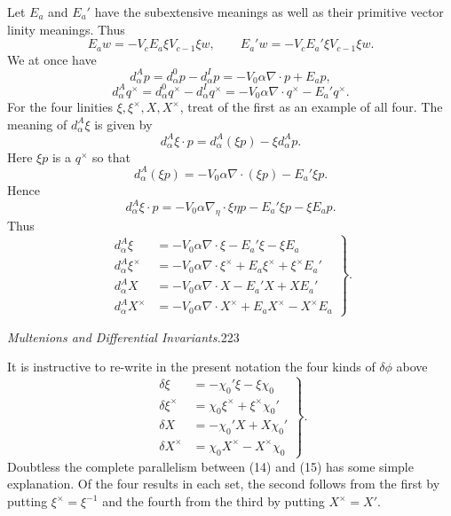 \documentclass[11pt]{article}
\begin{document}
\indent Let $E_a$ and $E_a'$ have the subextensive meanings as well as their primitive vector linity meanings. Thus
\begin{equation}E_aw=-V_cE_a\xi V_{c-1}\xi w,\qquad E_a'w=-V_cE_a'\xi V_{c-1}\xi w.\tag{11}\end{equation}
We at once have
\begin{equation}d_{\alpha}^{A}p=d_{\alpha}^{0}p-d_{\alpha}^{I}p=-V_0\alpha\nabla\cdot p+E_ap,\tag{12}\end{equation}
\begin{equation}d_{\alpha}^{A}q^\times=d_{\alpha}^{0}q^\times-d_{\alpha}^{I}q^\times=-V_0\alpha\nabla\cdot q^\times-E_a'q^\times.\tag{13}\end{equation}
For the four linities $\xi,\xi^\times,X,X^\times$, treat of the first as an example of all four. The meaning of $d_{\alpha}^{A}\xi$ is given by
\[
d_{\alpha}^{A}\xi\cdot p=d_{\alpha}^{A}(\xi p)-\xi d_{\alpha}^{A}p.
\]
Here $\xi p$ is a $q^\times$ so that
\[
d_{\alpha}^{A}(\xi p)=-V_0\alpha\nabla\cdot(\xi p)-E_a'\xi p.
\]
Hence
\[
d_{\alpha}^{A}\xi\cdot p=-V_0\alpha\nabla_\eta\cdot\xi\eta p-E_a'\xi p-\xi E_ap.
\]
Thus
\begin{equation}\left.\begin{aligned}
d_{\alpha}^{A}\xi&=-V_0\alpha\nabla\cdot\xi-E_a'\xi-\xi E_a\\
d_{\alpha}^{A}\xi^\times&=-V_0\alpha\nabla\cdot\xi^\times+E_a\xi^\times+\xi^\times E_a'\\
d_{\alpha}^{A}X&=-V_0\alpha\nabla\cdot X-E_a'X+XE_a'\\
d_{\alpha}^{A}X^\times&=-V_0\alpha\nabla\cdot X^\times+E_aX^\times-X^\times E_a
\end{aligned}\right\}.\tag{14}\end{equation}
\newpage\thispagestyle{empty}\begin{center}\textit{Multenions and Differential Invariants.}\hfill 223\end{center}
It is instructive to re-write in the present notation the four kinds of $\delta\phi$ above
\begin{equation}\left.\begin{aligned}
\delta\xi&=-\chi_0'\xi-\xi\chi_0\\
\delta\xi^\times&=\chi_0\xi^\times+\xi^\times\chi_0'\\
\delta X&=-\chi_0'X+X\chi_0'\\
\delta X^\times&=\chi_0X^\times-X^\times\chi_0
\end{aligned}\right\}.\tag{15}\end{equation}
Doubtless the complete parallelism between (14) and (15) has some simple explanation. Of the four results in each set, the second follows from the first by putting $\xi^\times=\xi^{-1}$ and the fourth from the third by putting $X^\times=X'$.
\end{document}
